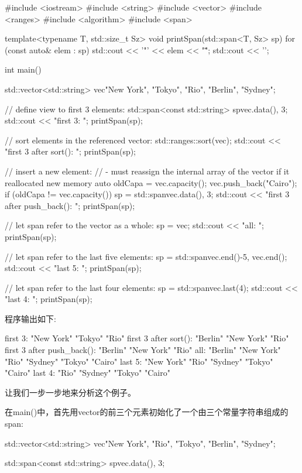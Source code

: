 
\begin{cpp}
#include <iostream>
#include <string>
#include <vector>
#include <ranges>
#include <algorithm>
#include <span>

template<typename T, std::size_t Sz>
void printSpan(std::span<T, Sz> sp)
{
	for (const auto& elem : sp) {
		std::cout << '"' << elem << "\" ";
	}
	std::cout << '\n';
}

int main()
{
	std::vector<std::string> vec{"New York", "Tokyo", "Rio", "Berlin", "Sydney"};

	// define view to first 3 elements:
	std::span<const std::string> sp{vec.data(), 3};
	std::cout << "first 3: ";
	printSpan(sp);

	// sort elements in the referenced vector:
	std::ranges::sort(vec);
	std::cout << "first 3 after sort(): ";
	printSpan(sp);

	// insert a new element:
	// - must reassign the internal array of the vector if it reallocated new memory
	auto oldCapa = vec.capacity();
	vec.push_back("Cairo");
	if (oldCapa != vec.capacity()) {
		sp = std::span{vec.data(), 3};
	}
	std::cout << "first 3 after push_back(): ";
	printSpan(sp);

	// let span refer to the vector as a whole:
	sp = vec;
	std::cout << "all: ";
	printSpan(sp);

	// let span refer to the last five elements:
	sp = std::span{vec.end()-5, vec.end()};
	std::cout << "last 5: ";
	printSpan(sp);

	// let span refer to the last four elements:
	sp = std::span{vec}.last(4);
	std::cout << "last 4: ";
	printSpan(sp);
}
\end{cpp}

程序输出如下:

\begin{shell}
first 3:              "New York" "Tokyo" "Rio"
first 3 after sort(): "Berlin" "New York" "Rio"
first 3 after push_back(): "Berlin" "New York" "Rio"
all:   "Berlin" "New York" "Rio" "Sydney" "Tokyo" "Cairo"
last 5: "New York" "Rio" "Sydney" "Tokyo" "Cairo"
last 4: "Rio" "Sydney" "Tokyo" "Cairo"
\end{shell}

让我们一步一步地来分析这个例子。


在main()中，首先用vector的前三个元素初始化了一个由三个常量字符串组成的span:

\begin{cpp}
std::vector<std::string> vec{"New York", "Rio", "Tokyo", "Berlin", "Sydney"};

std::span<const std::string> sp{vec.data(), 3};
\end{cpp}

